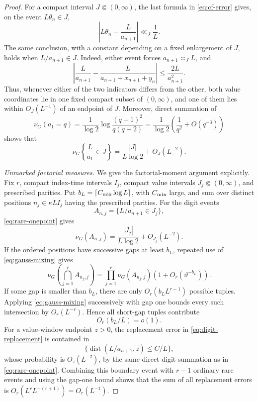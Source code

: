 \documentclass[11pt]{article}
\numberwithin{equation}{section}
\theoremstyle{definition}
\newcommand{\1}{\mathbf 1}
\begin{document}
\begin{proof}
For a compact interval \(J\Subset(0,\infty)\), the last formula in
\eqref{eq:cf-error} gives, on the event \(L\theta_n\in J\),
\begin{equation}\label{eq:digit-replacement}
 \left|L\theta_n-\frac{L}{a_{n+1}}\right|
 \ll_J\frac1L.
\end{equation}
The same conclusion, with a constant depending on a fixed enlargement
of \(J\), holds when \(L/a_{n+1}\in J\).  Indeed, either event forces
\(a_{n+1}\asymp_J L\), and
\[
 \left|\frac{L}{a_{n+1}}
       -\frac{L}{a_{n+1}+x_{n+1}+y_n}\right|
 \le\frac{2L}{a_{n+1}^2}.
\]
Thus, whenever either of the two indicators differs from the other,
both value coordinates lie in one fixed compact subset of
\((0,\infty)\), and one of them lies within \(O_J(L^{-1})\) of an
endpoint of \(J\).
Moreover, direct summation of
\[
 \nu_G(a_1=q)
 =\frac1{\log2}
 \log\frac{(q+1)^2}{q(q+2)}
 =\frac1{\log2}\left(\frac1{q^2}+O(q^{-3})\right)
\]
shows that
\begin{equation}\label{eq:rare-onepoint}
 \nu_G\left\{\frac{L}{a_1}\in J\right\}
 =\frac{|J|}{L\log2}+O_J(L^{-2}).
\end{equation}

\medskip
\noindent\emph{Unmarked factorial measures.}
We give the factorial-moment argument explicitly.  Fix \(r\), compact
index-time intervals \(I_j\), compact value intervals
\(J_j\Subset(0,\infty)\), and prescribed parities.  Put
\(b_L=\lceil C_{\rm mix}\log L\rceil\), with \(C_{\rm mix}\) large, and sum over
distinct positions \(n_j\in\kappa LI_j\) having the prescribed parities.
For the digit events
\[
 A_{n,j}=\{L/a_{n+1}\in J_j\},
\]
\eqref{eq:rare-onepoint} gives
\[
 \nu_G(A_{n,j})=\frac{|J_j|}{L\log2}+O_{J_j}(L^{-2}).
\]
If the ordered positions have successive gaps at least \(b_L\), repeated
use of \eqref{eq:gauss-mixing} gives
\begin{equation}\label{eq:long-tuple-product}
 \nu_G\!\left(\bigcap_{j=1}^rA_{n_j,j}\right)
 =\prod_{j=1}^r\nu_G(A_{n_j,j})
  \left(1+O_r(\vartheta^{-b_L})\right).
\end{equation}
If some gap is smaller than \(b_L\), there are only
\(O_r(b_LL^{r-1})\) possible tuples.  Applying
\eqref{eq:gauss-mixing} successively with gap one bounds every such
intersection by \(O_r(L^{-r})\).  Hence all short-gap tuples contribute
\begin{equation}\label{eq:short-tuples}
 O_r(b_L/L)=o(1).
\end{equation}
For a value-window endpoint \(z>0\), the replacement error in
\eqref{eq:digit-replacement} is contained in
\[
 \{\operatorname{dist}(L/a_{n+1},z)\le C/L\},
\]
whose probability is \(O_z(L^{-2})\), by the same direct digit
summation as in \eqref{eq:rare-onepoint}.  Combining this boundary event
with \(r-1\) ordinary rare events and using the gap-one bound shows that
the sum of all replacement errors is
\(O_r(L^rL^{-(r+1)})=O_r(L^{-1})\).


\end{proof}
\end{document}
